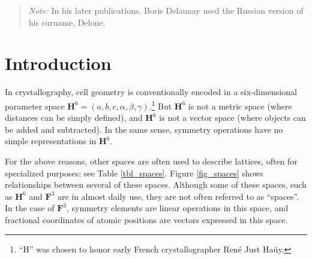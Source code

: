 \documentclass[preprint]{iucr}              %
\numberwithin{equation}{section}
\newcommand{\HVI}{\ensuremath{\mathbf{H}^{6}}}
\newcommand{\FIII}{\ensuremath{\mathbf{F}^{3}}}
\begin{document}
	
	
	\begin{abstract}
		
		
		\emph{Note:}  In his later publications, Boris Delaunay used the Russian version of his surname, Delone.
		
		
	\end{abstract}
	
	
	\section{Introduction}
	
	In crystallography, cell geometry is conventionally encoded in a six-dimensional parameter space 
	\ensuremath{\HVI{}=(a,b,c, \alpha, \beta, \gamma).}\footnote{``H'' was chosen to
		honor early French crystallographer Ren\'e Just Ha\"uy.} But \HVI{} is not a metric space
	(where distances can be simply defined), and \HVI{} is not a vector space (where 
	objects can be added and subtracted). In the same sense, symmetry operations
	have no simple representations in \HVI{}. 
	
	For the above reasons, other spaces are often used to describe lattices, often for specialized purposes; see Table  \ref{tbl_spaces}. Figure \ref{fig_spaces} shows relationships between
	several of these spaces. Although some of these spaces, such as \HVI{} and	\FIII{} are in almost daily use, they are not often referred to 
	as ``spaces''. In the case of \FIII{}, symmetry elements are linear
	operations in this space, and fractional coordinates of atomic positions
	are vectors expressed in this space.
	
\end{document}
